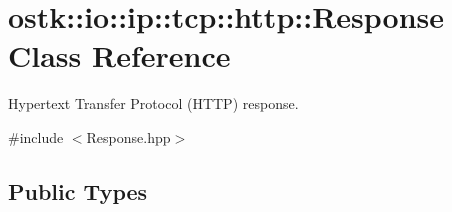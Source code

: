 \hypertarget{classostk_1_1io_1_1ip_1_1tcp_1_1http_1_1_response}{}\section{ostk\+:\+:io\+:\+:ip\+:\+:tcp\+:\+:http\+:\+:Response Class Reference}
\label{classostk_1_1io_1_1ip_1_1tcp_1_1http_1_1_response}


Hypertext Transfer Protocol (H\+T\+TP) response.  




{\ttfamily \#include $<$Response.\+hpp$>$}

\subsection*{Public Types}
